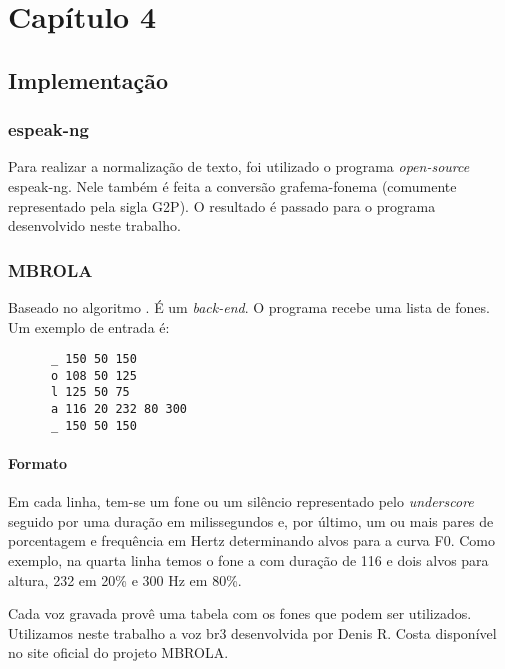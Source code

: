 
\chapter{Capítulo 4}

\section{Implementação}

\subsection{espeak-ng}
Para realizar a normalização de texto, foi utilizado o programa
\emph{open-source} espeak-ng. Nele também é feita a conversão grafema-fonema
(comumente representado pela sigla G2P). O resultado é passado para o programa
desenvolvido neste trabalho.

\subsection{MBROLA}
Baseado no algoritmo  \cite{mbrpsola}. É um \emph{back-end}. O programa recebe uma lista de
fones. Um exemplo de entrada é:

\begin{lstlisting}
      _ 150 50 150
      o 108 50 125
      l 125 50 75
      a 116 20 232 80 300
      _ 150 50 150
\end{lstlisting}


\subsubsection{Formato}
Em cada linha, tem-se um fone ou um silêncio representado pelo \emph{underscore} seguido por uma duração em milissegundos e, por último, um ou mais pares de porcentagem e frequência em Hertz determinando alvos para a curva F0. Como exemplo, na quarta linha temos o fone \/a\/ com duração de 116  e dois alvos para altura, 232  em 20\% e 300 Hz em 80\%.

Cada voz gravada provê uma tabela com os fones que podem ser utilizados. Utilizamos neste trabalho a voz br3 desenvolvida por Denis R. Costa disponível no site oficial do projeto MBROLA.

